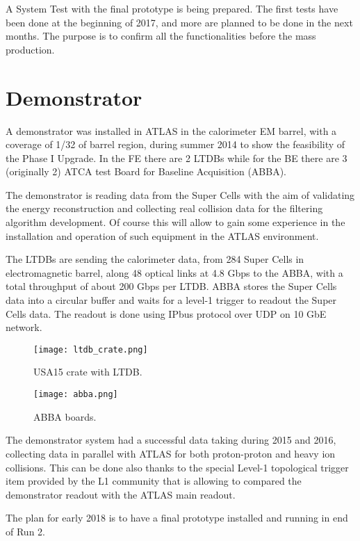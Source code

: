 \documentclass{llncs}
\begin{document}
A System Test with the final prototype is being prepared. The first tests have been done at the beginning of 2017, and more are planned to be done in the next months. The purpose is to confirm all the functionalities before the mass production.

\section{Demonstrator}
A demonstrator was installed in ATLAS in the calorimeter EM barrel, with a coverage of 1/32 of barrel region, during summer 2014 to show the feasibility of the Phase I Upgrade. In the FE there are 2 LTDBs while for the BE there are 3 (originally 2) ATCA test Board for Baseline Acquisition (ABBA).

The demonstrator is reading data from the Super Cells with the aim of validating the energy reconstruction and collecting real collision data for the filtering algorithm development. Of course this will allow to gain some experience in the installation and operation of such equipment in the ATLAS environment.

The LTDBs are sending the calorimeter data, from 284 Super Cells in electromagnetic barrel, along 48 optical links at 4.8 Gbps to the ABBA, with a total throughput of about 200 Gbps per LTDB. ABBA stores the Super Cells data into a circular buffer and waits for a level-1 trigger to readout the Super Cells data. The readout is done using IPbus protocol over UDP on 10 GbE network.

\begin{figure}[ht]
\begin{minipage}[l]{0.5\textwidth}
	\centering
	\texttt{[image: ltdb\_crate.png]}
	\caption{USA15 crate with LTDB.}
	\label{fig:demo_ltdb}
\end{minipage}
\begin{minipage}[r]{0.47\textwidth}
	\texttt{[image: abba.png]}
	\caption{ABBA boards.}
	\label{fig:abba}
\end{minipage}
\end{figure}

The demonstrator system had a successful data taking during 2015 and 2016, collecting data in parallel with ATLAS for both proton-proton and heavy ion collisions. This can be done also thanks to the special Level-1 topological trigger item provided by the L1 community that is allowing to compared the demonstrator readout with the ATLAS main readout.

The plan for early 2018 is to have a final prototype installed and running in end of Run 2.
\end{document}
